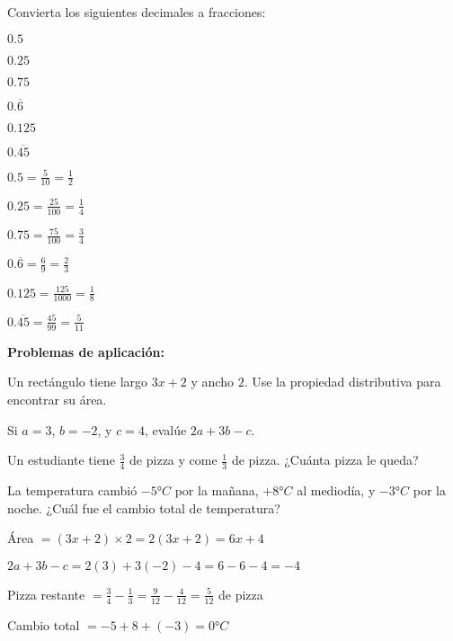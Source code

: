 \begin{exercise}
\problem Convierta los siguientes decimales a fracciones:

\begin{exerciselist}
    \item $0.5$
    \item $0.25$
    \item $0.75$
    \item $0.\overline{6}$
    \item $0.125$
    \item $0.\overline{45}$
\end{exerciselist}

\begin{solucion}
\begin{exerciselist}
    \item $0.5 = \frac{5}{10} = \frac{1}{2}$
    \item $0.25 = \frac{25}{100} = \frac{1}{4}$
    \item $0.75 = \frac{75}{100} = \frac{3}{4}$
    \item $0.\overline{6} = \frac{6}{9} = \frac{2}{3}$
    \item $0.125 = \frac{125}{1000} = \frac{1}{8}$
    \item $0.\overline{45} = \frac{45}{99} = \frac{5}{11}$
\end{exerciselist}
\end{solucion}
\end{exercise}

\begin{exercise}
\problem \textbf{Problemas de aplicación:}

\begin{exerciselist}
    \item Un rectángulo tiene largo $3x + 2$ y ancho $2$. Use la propiedad distributiva para encontrar su área.
    \item Si $a = 3$, $b = -2$, y $c = 4$, evalúe $2a + 3b - c$.
    \item Un estudiante tiene $\frac{3}{4}$ de pizza y come $\frac{1}{3}$ de pizza. ¿Cuánta pizza le queda?
    \item La temperatura cambió $-5°C$ por la mañana, $+8°C$ al mediodía, y $-3°C$ por la noche. ¿Cuál fue el cambio total de temperatura?
\end{exerciselist}

\begin{solucion}
\begin{exerciselist}
    \item Área $= (3x + 2) \times 2 = 2(3x + 2) = 6x + 4$
    \item $2a + 3b - c = 2(3) + 3(-2) - 4 = 6 - 6 - 4 = -4$
    \item Pizza restante $= \frac{3}{4} - \frac{1}{3} = \frac{9}{12} - \frac{4}{12} = \frac{5}{12}$ de pizza
    \item Cambio total $= -5 + 8 + (-3) = 0°C$
\end{exerciselist}
\end{solucion}
\end{exercise}